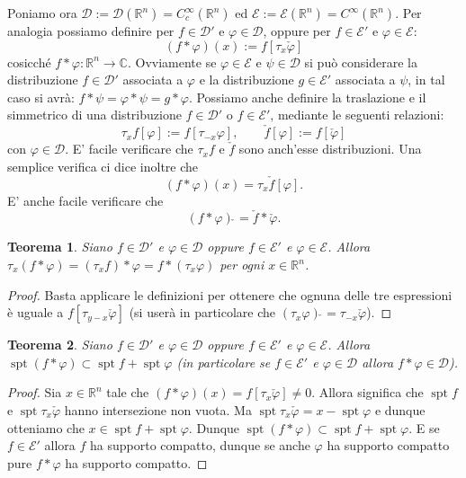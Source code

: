 \documentclass[italian,a4paper,oneside,headinclude]{scrbook}
\renewcommand{\phi}{\varphi}
\newcommand{\D}{\mathcal D}
\newcommand{\E}{\mathcal E}
\newcommand{\CC}{\mathbb C}
\newcommand{\RR}{\mathbb R}
\newcommand{\defeq}{:=}
\DeclareMathOperator{\spt}{spt}
\newtheorem{theorem}{Teorema}
\begin{document}
Poniamo ora $\D\defeq \D(\RR^n) = C_c^\infty(\RR^n)$
ed $\E\defeq \E(\RR^n)=C^\infty(\RR^n)$.
\marginpar{$\D, \E$}
Per analogia possiamo definire per
$f\in\D'$ e $\phi\in\D$, oppure per $f\in \E'$ e $\phi\in \E$:
\marginpar{$f*\phi$}
\[
(f*\phi)(x) \defeq f[\tau_x \check \phi]
\]
cosicché $f*\phi\colon \RR^n\to\CC$.
Ovviamente se $\phi\in \E$ e $\psi\in \D$ si può considerare
la distribuzione $f\in \D'$ associata a $\phi$ e la distribuzione
$g\in \E'$ associata a $\psi$,
in tal caso si avrà: $f * \psi = \phi * \psi = g * \phi$.
Possiamo anche definire la traslazione e il simmetrico di una
distribuzione $f\in\D'$ o $f\in \E'$, mediante
le seguenti relazioni:
\[
\tau_x f[\phi] \defeq f[\tau_{-x}\phi],\qquad
\check f[\phi] \defeq
f[\check \phi]
\]
con $\phi\in\D$.
E' facile verificare che $\tau_x f$ e $\check f$ sono anch'esse
distribuzioni. Una semplice verifica ci dice inoltre che
\[
(f*\phi)(x) = \tau_x\check f[\phi].
\]
E' anche facile verificare che
\[
  (f*\phi)\check\, = \check f * \check \phi.
\]

\begin{theorem}
  Siano $f\in\D'$ e $\phi\in\D$ oppure $f\in \E'$ e $\phi \in \E$.
  Allora
  $\tau_x(f * \phi) = (\tau_x f) * \phi = f * (\tau_x\phi)$ per
    ogni $x\in \RR^n$.
\end{theorem}
%
\begin{proof}
Basta applicare le definizioni per ottenere che ognuna delle
      tre espressioni è uguale a $f[\tau_{y-x}\check \phi]$ (si userà in
      particolare che $(\tau_x \phi)\check\, = \tau_{-x}\check \phi$).
\end{proof}

\begin{theorem}
  Siano $f\in\D'$ e $\phi\in\D$ oppure $f\in \E'$ e $\phi \in \E$.
  Allora
  $\spt(f*\phi) \subset \spt f + \spt \phi$ (in particolare se
    $f\in \E'$ e $\phi\in \D$ allora $f*\phi\in \D$).
\end{theorem}
%
\begin{proof}
      Sia $x\in \RR^n$ tale che
      $(f*\phi)(x) = f[\tau_x \check \phi] \neq 0$.
      Allora significa che $\spt f$ e $\spt \tau_x \check \phi$ hanno
      intersezione non vuota.
      Ma $\spt \tau_x\check \phi = x-\spt\phi$ e dunque otteniamo che
      $x\in \spt f + \spt \phi$.
      Dunque $\spt (f*\phi)\subset \spt f + \spt \phi$.
      E se $f\in \E'$ allora $f$ ha supporto compatto, dunque se anche
      $\phi$ ha supporto compatto pure $f * \phi$ ha supporto compatto.
\end{proof}
\end{document}
